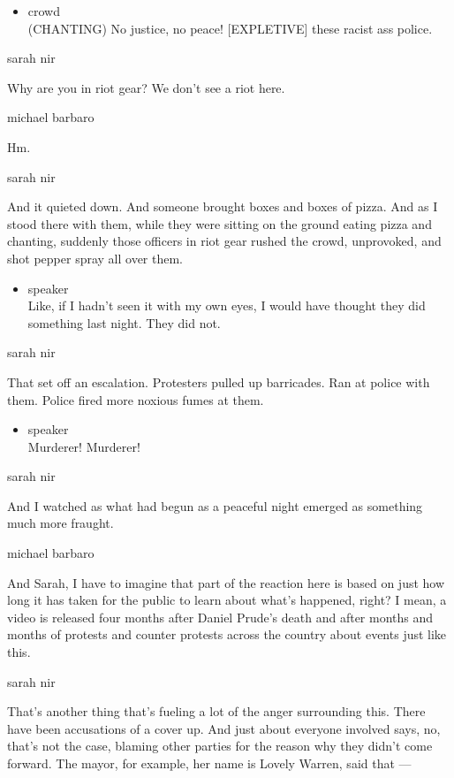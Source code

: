 \begin{itemize}
\tightlist
\item
  crowd\\
  (CHANTING) No justice, no peace! {[}EXPLETIVE{]} these racist ass
  police.
\end{itemize}

sarah nir

Why are you in riot gear? We don't see a riot here.

michael barbaro

Hm.

sarah nir

And it quieted down. And someone brought boxes and boxes of pizza. And
as I stood there with them, while they were sitting on the ground eating
pizza and chanting, suddenly those officers in riot gear rushed the
crowd, unprovoked, and shot pepper spray all over them.

\begin{itemize}
\tightlist
\item
  speaker\\
  Like, if I hadn't seen it with my own eyes, I would have thought they
  did something last night. They did not.
\end{itemize}

sarah nir

That set off an escalation. Protesters pulled up barricades. Ran at
police with them. Police fired more noxious fumes at them.

\begin{itemize}
\tightlist
\item
  speaker\\
  Murderer! Murderer!
\end{itemize}

sarah nir

And I watched as what had begun as a peaceful night emerged as something
much more fraught.

michael barbaro

And Sarah, I have to imagine that part of the reaction here is based on
just how long it has taken for the public to learn about what's
happened, right? I mean, a video is released four months after Daniel
Prude's death and after months and months of protests and counter
protests across the country about events just like this.

sarah nir

That's another thing that's fueling a lot of the anger surrounding this.
There have been accusations of a cover up. And just about everyone
involved says, no, that's not the case, blaming other parties for the
reason why they didn't come forward. The mayor, for example, her name is
Lovely Warren, said that ---

